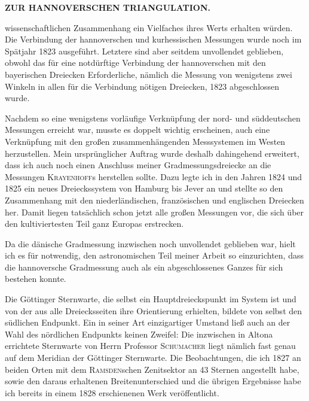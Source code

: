 \noindent\null\hfill{\small\textbf{ZUR HANNOVERSCHEN TRIANGULATION.}}\hfill{}\par\medskip
\noindent wissenschaftlichen Zusammenhang ein Vielfaches ihres Werts erhalten würden.
Die Verbindung der hannoverschen und kurhessischen Messungen wurde noch
im Spätjahr 1823 ausgeführt. Letztere sind aber seitdem unvollendet geblieben,
obwohl das für eine notdürftige Verbindung der hannoverschen mit den bayerischen
Dreiecken Erforderliche, nämlich die Messung von wenigstens zwei Winkeln
in allen für die Verbindung nötigen Dreiecken, 1823 abgeschlossen wurde.

\par\noindent\hspace*{\parindent}Nachdem so eine wenigstens vorläufige Verknüpfung der nord- und
süddeutschen Messungen erreicht war, musste es doppelt wichtig erscheinen,
auch eine Verknüpfung mit den großen zusammenhängenden Messsystemen im
Westen herzustellen. Mein ursprünglicher Auftrag wurde deshalb dahingehend
erweitert, dass ich auch noch einen Anschluss meiner Gradmessungsdreiecke an
die Messungen \textsc{Krayenhoff}s herstellen sollte. Dazu legte ich in den Jahren
1824 und 1825 ein neues Dreieckssystem von Hamburg bis Jever an und stellte
so den Zusammenhang mit den niederländischen, französischen und englischen
Dreiecken her. Damit liegen tatsächlich schon jetzt alle großen Messungen vor,
die sich über den kultiviertesten Teil ganz Europas erstrecken.

\par\noindent\hspace*{\parindent}Da die dänische Gradmessung inzwischen noch unvollendet geblieben
war, hielt ich es für notwendig, den astronomischen Teil meiner Arbeit so
einzurichten, dass die hannoversche Gradmessung auch als ein abgeschlossenes
Ganzes für sich bestehen konnte.

\par\noindent\hspace*{\parindent}Die Göttinger Sternwarte, die selbst ein Hauptdreieckspunkt im System
ist und von der aus alle Dreiecksseiten ihre Orientierung erhielten, bildete von
selbst den südlichen Endpunkt. Ein in seiner Art einzigartiger Umstand ließ
auch an der Wahl des nördlichen Endpunkts keinen Zweifel: Die inzwischen in
Altona errichtete Sternwarte von Herrn Professor \textsc{Schumacher} liegt nämlich
fast genau auf dem Meridian der Göttinger Sternwarte. Die Beobachtungen,
die ich 1827 an beiden Orten mit dem \textsc{Ramsden}schen Zenitsektor an
43 Sternen angestellt habe, sowie den daraus erhaltenen Breitenunterschied und die
übrigen Ergebnisse habe ich bereits in einem 1828 erschienenen Werk veröffentlicht.

